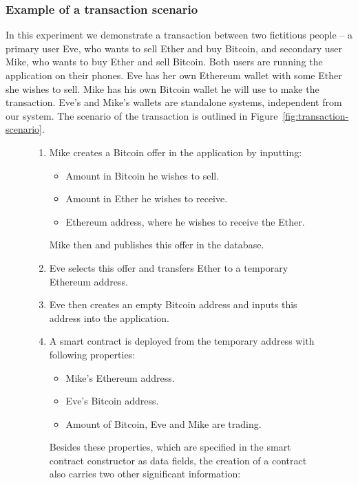 \subsubsection{Example of a transaction scenario}
In this experiment we demonstrate a transaction between two fictitious people -- a primary user Eve, who wants to sell Ether and buy Bitcoin, and secondary user Mike, who wants to buy Ether and sell Bitcoin. Both users are running the application on their phones. Eve has her own Ethereum wallet with some Ether she wishes to sell. Mike has his own Bitcoin wallet he will use to make the transaction. Eve's and Mike's wallets are standalone systems, independent from our system. The scenario of the transaction is outlined in Figure~\ref{fig:transaction-scenario}. 

\begin{figure}[ht]
    \centering
    \begin{framed}
    \begin{enumerate}[noitemsep]
        \item Mike creates a Bitcoin offer in the application by inputting:
            \begin{itemize}[nolistsep,noitemsep]
                \item Amount in Bitcoin he wishes to sell.
                \item Amount in Ether he wishes to receive.
                \item Ethereum address, where he wishes to receive the Ether.
            \end{itemize}
            Mike then and publishes this offer in the database.
        \item Eve selects this offer and transfers Ether to a temporary Ethereum address.
        \item Eve then creates an empty Bitcoin address and inputs this address into the application.
        \item A smart contract is deployed from the temporary address with following properties:
            \begin{itemize}[nolistsep,noitemsep]
                \item Mike's Ethereum address.
                \item Eve's Bitcoin address.
                \item Amount of Bitcoin, Eve and Mike are trading.
            \end{itemize}
            Besides these properties, which are specified in the smart contract constructor as data fields, the creation of a contract also carries two other significant information:

\end{enumerate}
\end{framed}
\end{figure}
